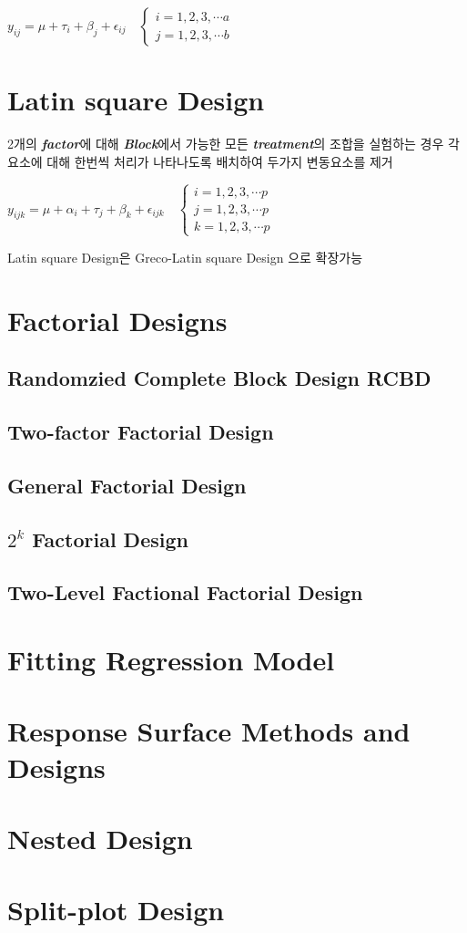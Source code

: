 \documentclass{article}
\newcommand{\imp}[1]{\textbf{\textit{#1}}}
\begin{document}
    $y_{ij} = \mu+\tau_i+\beta_j+\epsilon_{ij} \quad \left\{
    \begin{matrix}
    i = 1,2,3,\cdots a\\
    j = 1,2,3,\cdots b
    \end{matrix}\right.$
    \section{Latin square Design}
    2개의 \imp{factor}에 대해 \imp{Block}에서 가능한 모든 \imp{treatment}의 조합을 실험하는 경우 
    각 요소에 대해 한번씩 처리가 나타나도록 배치하여 두가지 변동요소를 제거

    $y_{ijk} = \mu+\alpha_i+\tau_j+\beta_k+\epsilon_{ijk} \quad \left\{
    \begin{matrix}
    i = 1,2,3,\cdots p\\
    j = 1,2,3,\cdots p\\
    k = 1,2,3,\cdots p
    \end{matrix}\right.$
    
    Latin square Design은 Greco-Latin square Design 으로 확장가능

    \section{Factorial Designs}
    \subsection{Randomzied Complete Block Design \textbf{RCBD}}
    \subsection{Two-factor Factorial Design}
    \subsection{General Factorial Design}
    \subsection{$2^k$ Factorial Design}
    \subsection{Two-Level Factional Factorial Design}

    \section{Fitting Regression Model}
    \section{Response Surface Methods and Designs}
    \section{Nested Design}
    \section{Split-plot Design}
\end{document}
